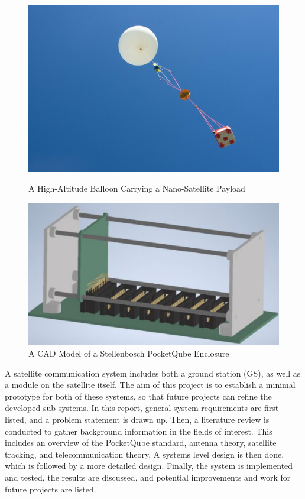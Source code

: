 \begin{figure}[!htb]
  \begin{minipage}{.49\textwidth}
    \centering
    \includegraphics[width=0.95\linewidth]{balloonSat}
    \caption{A High-Altitude Balloon Carrying a Nano-Satellite Payload \cite{site-cyberBalloonLaunch}}
    \label{fig:balloonSat}
  \end{minipage}
  \begin{minipage}{.49\textwidth}
    \centering
    \includegraphics[width=0.99\linewidth]{pq_enclosure}
    \caption{A CAD Model of a Stellenbosch PocketQube Enclosure \cite{standard-pqsu}}
    \label{fig:pq_enclosure}
  \end{minipage}
\end{figure}

A satellite communication system includes both a ground station (GS), as well as a module on the satellite itself. The aim of this project is to establish a minimal prototype for both of these systems, so that future projects can refine the developed sub-systems. In this report, general system requirements are first listed, and a problem statement is drawn up. Then, a literature review is conducted to gather background information in the fields of interest. This includes an overview of the PocketQube standard, antenna theory, satellite tracking, and telecommunication theory. A systems level design is then done, which is followed by a more detailed design. Finally, the system is implemented and tested, the results are discussed, and potential improvements and work for future projects are listed.